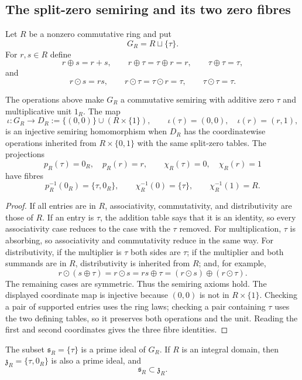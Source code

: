 \subsection{The split-zero semiring and its two zero fibres}

Let $R$ be a nonzero commutative ring and put
\[
  G_R=R\sqcup\{\tau\}.
\]
For $r,s\in R$ define
\[
 r\oplus s=r+s,\qquad r\oplus\tau=\tau\oplus r=r,
 \qquad \tau\oplus\tau=\tau,
\]
and
\[
 r\odot s=rs,\qquad r\odot\tau=\tau\odot r=\tau,
 \qquad \tau\odot\tau=\tau.
\]

\begin{proposition}
\label{prop:primitive-split-zero}
The operations above make $G_R$ a commutative semiring with additive zero
$\tau$ and multiplicative unit $1_R$.  The map
\[
 \iota:G_R\longrightarrow D_R:=\{(0,0)\}\cup(R\times\{1\}),
 \qquad \iota(\tau)=(0,0),\quad \iota(r)=(r,1),
\]
is an injective semiring homomorphism when $D_R$ has the coordinatewise
operations inherited from $R\times\{0,1\}$ with the same split-zero tables.
The projections
\[
 p_R(\tau)=0_R,\quad p_R(r)=r,
 \qquad
 \chi_R(\tau)=0,\quad \chi_R(r)=1
\]
have fibres
\[
 p_R^{-1}(0_R)=\{\tau,0_R\},\qquad
 \chi_R^{-1}(0)=\{\tau\},\qquad
 \chi_R^{-1}(1)=R.
\]
\end{proposition}

\begin{proof}
If all entries are in $R$, associativity, commutativity, and distributivity
are those of $R$.  If an entry is $\tau$, the addition table says that it is
an identity, so every associativity case reduces to the case with the $\tau$
removed.  For multiplication, $\tau$ is absorbing, so associativity and
commutativity reduce in the same way.  For distributivity, if the multiplier
is $\tau$ both sides are $\tau$; if the multiplier and both summands are in
$R$, distributivity is inherited from $R$; and, for example,
\[
 r\odot(s\oplus\tau)=r\odot s=rs\oplus\tau
                 =(r\odot s)\oplus(r\odot\tau).
\]
The remaining cases are symmetric.  Thus the semiring axioms hold.
The displayed coordinate map is injective because $(0,0)$ is not in
$R\times\{1\}$.  Checking a pair of supported entries uses the ring laws;
checking a pair containing $\tau$ uses the two defining tables, so it
preserves both operations and the unit.  Reading the first and second
coordinates gives the three fibre identities.
\end{proof}

\begin{theorem}
\label{thm:primitive-prime-ideals}
The subset $\mathfrak s_R=\{\tau\}$ is a prime ideal of $G_R$.  If $R$ is an
integral domain, then $\mathfrak z_R=\{\tau,0_R\}$ is also a prime ideal, and
\[
 \mathfrak s_R\subset\mathfrak z_R.
\]
\end{theorem}


